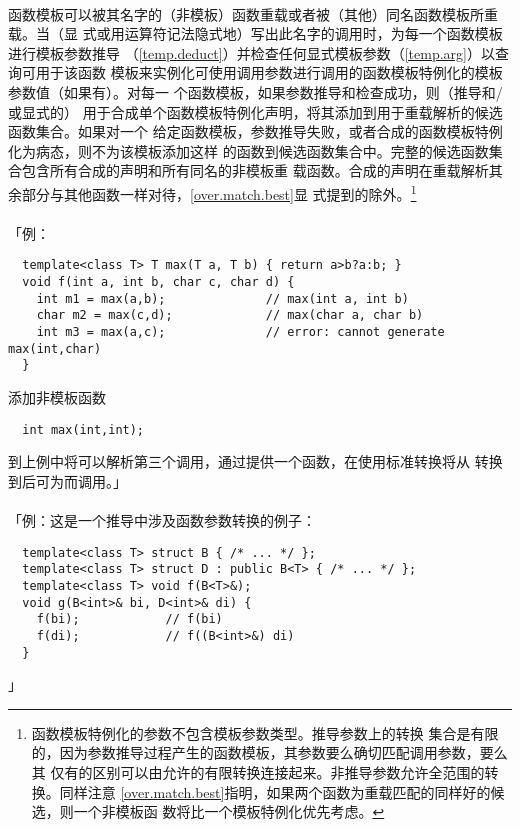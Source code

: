 \paragraph{}
函数模板可以被其名字的（非模板）函数重载或者被（其他）同名函数模板所重载。当（显
式或用运算符记法隐式地）写出此名字的调用时，为每一个函数模板进行模板参数推导
（\ref{temp.deduct}）并检查任何显式模板参数（\ref{temp.arg}）以查询可用于该函数
模板来实例化可使用调用参数进行调用的函数模板特例化的模板参数值（如果有）。对每一
个函数模板，如果参数推导和检查成功，则（推导和/或显式的）
用于合成单个函数模板特例化声明，将其添加到用于重载解析的候选函数集合。如果对一个
给定函数模板，参数推导失败，或者合成的函数模板特例化为病态，则不为该模板添加这样
的函数到候选函数集合中。完整的候选函数集合包含所有合成的声明和所有同名的非模板重
载函数。合成的声明在重载解析其余部分与其他函数一样对待，\ref{over.match.best}显
式提到的除外。\footnote{函数模板特例化的参数不包含模板参数类型。推导参数上的转换
集合是有限的，因为参数推导过程产生的函数模板，其参数要么确切匹配调用参数，要么其
仅有的区别可以由允许的有限转换连接起来。非推导参数允许全范围的转换。同样注意
\ref{over.match.best}指明，如果两个函数为重载匹配的同样好的候选，则一个非模板函
数将比一个模板特例化优先考虑。}

\paragraph{}
「例：
\begin{lstlisting}
  template<class T> T max(T a, T b) { return a>b?a:b; }
  void f(int a, int b, char c, char d) {
    int m1 = max(a,b);              // max(int a, int b)
    char m2 = max(c,d);             // max(char a, char b)
    int m3 = max(a,c);              // error: cannot generate max(int,char)
  }
\end{lstlisting}
添加非模板函数
\begin{lstlisting}
  int max(int,int);
\end{lstlisting}
到上例中将可以解析第三个调用，通过提供一个函数，在使用标准转换将从
转换到后可为而调用。」

\paragraph{}
「例：这是一个推导中涉及函数参数转换的例子：
\begin{lstlisting}
  template<class T> struct B { /* ... */ };
  template<class T> struct D : public B<T> { /* ... */ };
  template<class T> void f(B<T>&);
  void g(B<int>& bi, D<int>& di) {
    f(bi);            // f(bi)
    f(di);            // f((B<int>&) di)
  }
\end{lstlisting}」

